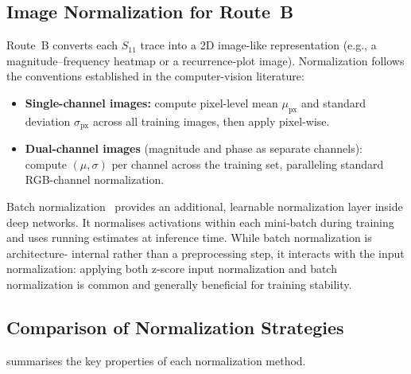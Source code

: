 \subsection{Image Normalization for Route~B}
\label{sec:norm:image}

Route~B converts each $S_{11}$ trace into a 2D image-like
representation (e.g., a magnitude--frequency heatmap or a
recurrence-plot image).  Normalization follows the conventions
established in the computer-vision literature:

\begin{itemize}
  \item \textbf{Single-channel images:} compute pixel-level mean
        $\mu_{\text{px}}$ and standard deviation $\sigma_{\text{px}}$
        across all training images, then apply
         pixel-wise.
  \item \textbf{Dual-channel images} (magnitude and phase as separate
        channels): compute $(\mu,\sigma)$ per channel across the
        training set, paralleling standard RGB-channel normalization.
\end{itemize}

Batch normalization~\cite{ioffe2015batchnorm} provides an additional,
learnable normalization layer inside deep networks.  It normalises
activations within each mini-batch during training and uses running
estimates at inference time.  While batch normalization is architecture-
internal rather than a preprocessing step, it interacts with the input
normalization: applying both z-score input normalization and batch
normalization is common and generally beneficial for training stability.

\subsection{Comparison of Normalization Strategies}
\label{sec:norm:comparison}

 summarises the key properties of each
normalization method.

